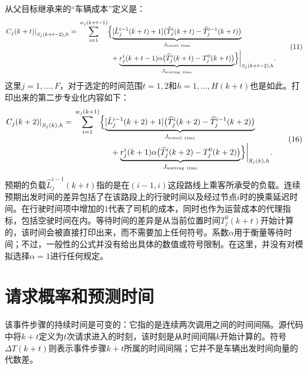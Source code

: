 \documentclass[11pt]{article}
\begin{document}
从父目标继承来的“车辆成本”定义是：
\begin{equation}
\begin{aligned}
\left.C_j(k+t)\right|_{S_j(k+t-2),h}
={}&\sum_{i=1}^{w_j(k+t-1)}\Bigl\{
\underbrace{[\hat{L}_j^{i-1}(k+t)+1]
\bigl(\widehat{T}_j^i(k+t)-\widehat{T}_j^{i-1}(k+t)\bigr)}_{J_{\mathrm{travel\ time}}}\\
&\hspace{16mm}+\underbrace{r_j^i(k+t-1)\alpha
\bigl(\widehat{T}_j^i(k+t)-T_j^0(k+t)\bigr)}_{J_{\mathrm{waiting\ time}}}
\Bigr\}\biggr|_{S_j(k+t-2),h}.
\end{aligned}
\tag{11}
\end{equation}
这里$j=1,\ldots,F$，对于选定的时间范围$t=1,2$和$h=1,\ldots,H(k+t)$也是如此。打印出来的第二步专业化内容如下：
\begin{equation}
\begin{aligned}
\left.C_j(k+2)\right|_{S_j(k),h}
={}&\sum_{i=1}^{w_j(k+1)}\Bigl\{
\underbrace{[\hat{L}_j^{i-1}(k+2)+1]
\bigl(\widehat{T}_j^i(k+2)-\widehat{T}_j^{i-1}(k+2)\bigr)}_{J_{\mathrm{travel\ time}}}\\
&\hspace{16mm}+\underbrace{r_j^i(k+1)\alpha
\bigl(\widehat{T}_j^i(k+2)-T_j^0(k+2)\bigr)}_{J_{\mathrm{waiting\ time}}}
\Bigr\}\biggr|_{S_j(k),h}.
\end{aligned}
\tag{16}
\end{equation}
预期的负载$\hat{L}_j^{i-1}(k+t)$指的是在$(i-1,i)$这段路线上乘客所承受的负载。连续预期出发时间的差异包括了在该路段上的行驶时间以及经过节点$i$时的换乘延迟时间。在行驶时间项中增加的$1$代表了司机的成本，同时也作为运营成本的代理指标，包括空驶时间在内。等待时间的差异是从当前位置时间$T_j^0(k+t)$开始计算的，该时间会被直接打印出来，而不需要加上任何符号。系数$\alpha$用于衡量等待时间；不过，一般性的公式并没有给出具体的数值或符号限制。在这里，并没有对模拟选择$\alpha=1$进行任何规定。

\section*{请求概率和预测时间}
该事件步骤的持续时间是可变的：它指的是连续两次调用之间的时间间隔。源代码中将$k+t$定义为$t$次请求进入的时刻，该时刻是从时间间隔$k$开始计算的。符号$\Delta T(k+t)$则表示事件步骤$k+t$所属的时间间隔；它并不是车辆出发时间向量的代数差。
\end{document}
